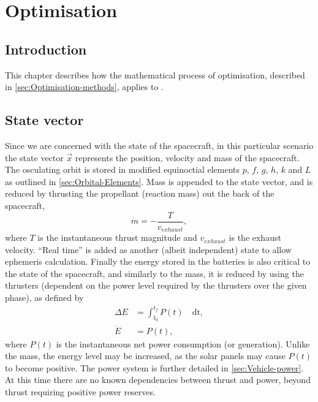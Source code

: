 \chapter{Optimisation} \label{cha:Optimisation}
\section{Introduction} \label{sec:Optimisation-Introduction}

This chapter describes how the mathematical process of optimisation, described in \autoref{sec:Optimisation-methods}, applies to \BW.

\section{State vector} \label{sec:state-vector}

Since we are concerned with the state of the spacecraft, in this particular scenario the state vector $\vec{x}$ represents the position, velocity and mass of the spacecraft. The osculating orbit is stored in modified equinoctial elements $p$, $f$, $g$, $h$, $k$ and $L$ as outlined in \autoref{sec:Orbital-Elements}. Mass is appended to the state vector, and is reduced by thrusting the propellant (reaction mass) out the back of the spacecraft, 
\begin{equation}
\dot{m}=-\frac{T}{v_{exhaust}} \label{eq:mdot},
\end{equation}
where $T$ is the instantaneous thrust magnitude and $v_{exhaust}$ is the exhaust velocity. \enquote{Real time} is added as another (albeit independent) state to allow ephemeris calculation. Finally the energy stored in the batteries is also critical to the state of the spacecraft, and similarly to the mass, it is reduced by using the thrusters (dependent on the power level required by the thrusters over the given phase), as defined by
\begin{subequations}\label{eq:edot}
\begin{align}
\Delta E &= \int_{t_0}^{t_f} P(t)\quad \text{dt} \label{eq:delta-E}, \\
\dot{E} &= P(t) \label{eq:Edot},
\end{align} 
\end{subequations} where $P(t)$ is the instantaneous net power consumption (or generation). Unlike the mass, the energy level may be increased, as the solar panels may cause $P(t)$ to become positive. The power system is further detailed in \autoref{sec:Vehicle-power}. At this time there are no known dependencies between thrust and power, beyond thrust requiring positive power reserves.


